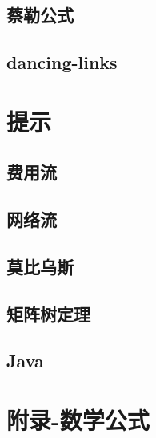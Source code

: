 \documentclass[titlepage,a4paper,10pt]{article}
\begin{document}
\begin{spacing}{0.8}
			\subsection{蔡勒公式}
				
			\subsection{dancing-links}
				
		\section{提示}
			\subsection{费用流}
				
			\subsection{网络流}
				
			\subsection{莫比乌斯}
				
			\subsection{矩阵树定理}
				
			\subsection{Java}
				
		\section{附录-数学公式}
		\end{spacing}
		\endgroup
\end{document}
